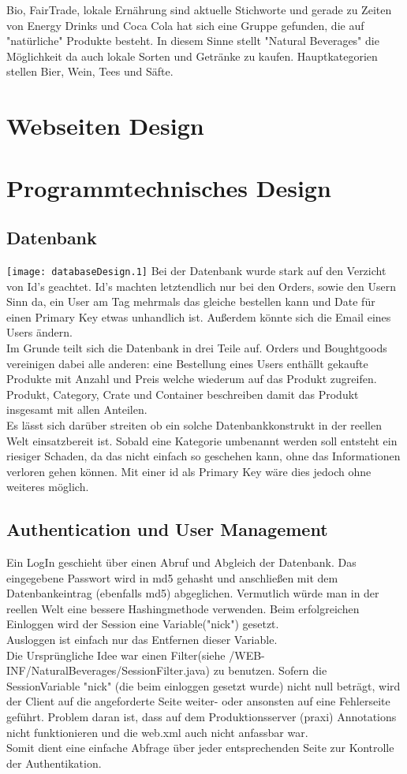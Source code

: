 \documentclass[a4paper, 11pt]{article}
\begin{document}
Bio, FairTrade, lokale Ernährung sind aktuelle Stichworte und gerade zu Zeiten von Energy Drinks und Coca Cola hat sich eine Gruppe gefunden, die auf "natürliche" Produkte besteht. In diesem Sinne stellt "Natural Beverages" die Möglichkeit da auch lokale Sorten und Getränke zu kaufen. Hauptkategorien stellen Bier, Wein, Tees und Säfte.  
\section{Webseiten Design}

\section{Programmtechnisches Design}

\subsection{Datenbank}
\texttt{[image: databaseDesign.1]}
Bei der Datenbank wurde stark auf den Verzicht von Id's geachtet. Id's machten letztendlich nur bei den Orders, sowie den Usern Sinn da, ein User am Tag mehrmals das gleiche bestellen kann und Date für einen Primary Key etwas unhandlich ist. Außerdem könnte sich die Email eines Users ändern. \\
Im Grunde teilt sich die Datenbank in drei Teile auf. Orders und Boughtgoods vereinigen dabei alle anderen: eine Bestellung eines Users enthällt gekaufte Produkte mit Anzahl und Preis welche wiederum auf das Produkt zugreifen. Produkt, Category, Crate und Container beschreiben damit das Produkt insgesamt mit allen Anteilen. \\
Es lässt sich darüber streiten ob ein solche Datenbankkonstrukt in der reellen Welt einsatzbereit ist. Sobald eine Kategorie umbenannt werden soll entsteht ein riesiger Schaden, da das nicht einfach so geschehen kann, ohne das Informationen verloren gehen können. Mit einer id als Primary Key wäre dies jedoch ohne weiteres möglich.

\subsection{Authentication und User Management}
Ein LogIn geschieht über einen Abruf und Abgleich der Datenbank. Das eingegebene Passwort wird in md5 gehasht und anschließen mit dem Datenbankeintrag (ebenfalls md5) abgeglichen. Vermutlich würde man in der reellen Welt eine bessere Hashingmethode verwenden. Beim erfolgreichen Einloggen wird der Session eine Variable("nick") gesetzt. \\
Ausloggen ist einfach nur das Entfernen dieser Variable.\\
Die Ursprüngliche Idee war einen Filter(siehe /WEB-INF/NaturalBeverages/SessionFilter.java) zu benutzen. Sofern die SessionVariable "nick" (die beim einloggen gesetzt wurde) nicht null beträgt, wird der Client auf die angeforderte Seite weiter- oder ansonsten auf eine Fehlerseite geführt. Problem daran ist, dass auf dem Produktionsserver (praxi) Annotations nicht funktionieren und die web.xml auch nicht anfassbar war. \\
Somit dient eine einfache Abfrage über jeder entsprechenden Seite zur Kontrolle der Authentikation.  
\end{document}
